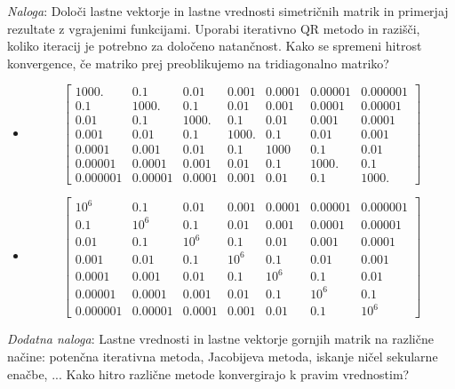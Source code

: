 \documentclass[12pt]{article}
\begin{document}
\medskip

{\it Naloga\/}: Določi lastne vektorje in lastne vrednosti simetričnih matrik in primerjaj rezultate z vgrajenimi funkcijami. Uporabi iterativno QR metodo in razišči, koliko iteracij je potrebno za določeno natančnost. Kako se spremeni hitrost konvergence, če matriko prej preoblikujemo na tridiagonalno matriko?
\begin{itemize}
	\item \[ \begin{bmatrix}
1000. & 0.1 & 0.01 & 0.001 & 0.0001 & 0.00001 & 0.000001 \\
0.1 & 1000. & 0.1 & 0.01 & 0.001 & 0.0001 & 0.00001 \\
0.01 & 0.1 & 1000. & 0.1 & 0.01 & 0.001 & 0.0001\\
0.001 & 0.01 & 0.1 & 1000. & 0.1 & 0.01 & 0.001\\
0.0001 & 0.001 & 0.01 & 0.1 & 1000 & 0.1 & 0.01\\
0.00001 & 0.0001 & 0.001 & 0.01 & 0.1 & 1000.  & 0.1 \\
0.000001 & 0.00001 & 0.0001 & 0.001 & 0.01 & 0.1 & 1000.
	\end{bmatrix} \]
\item \[ \begin{bmatrix}
10^6 & 0.1 & 0.01 & 0.001 & 0.0001 & 0.00001 & 0.000001 \\
0.1 & 10^6 & 0.1 & 0.01 & 0.001 & 0.0001 & 0.00001 \\
0.01 & 0.1 & 10^6 & 0.1 & 0.01 & 0.001 & 0.0001\\
0.001 & 0.01 & 0.1 & 10^6 & 0.1 & 0.01 & 0.001\\
0.0001 & 0.001 & 0.01 & 0.1 & 10^6 & 0.1 & 0.01\\
0.00001 & 0.0001 & 0.001 & 0.01 & 0.1 & 10^6  & 0.1 \\
0.000001 & 0.00001 & 0.0001 & 0.001 & 0.01 & 0.1 & 10^6
	\end{bmatrix} \]
\end{itemize}

{\it Dodatna naloga\/}: Lastne vrednosti in lastne vektorje gornjih matrik na različne načine: potenčna iterativna
metoda, Jacobijeva metoda, iskanje ničel sekularne enačbe, ... Kako hitro različne metode konvergirajo k pravim vrednostim?

\clearpage
\end{document}
